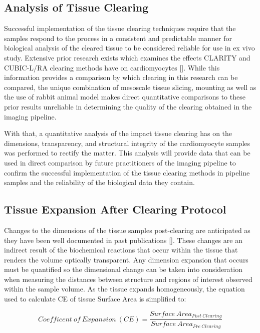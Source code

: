 \subsection{Analysis of Tissue Clearing}
Successful implementation of the tissue clearing techniques require that the samples respond to the process in a consistent and predictable manner for biological analysis of the cleared tissue to be considered reliable for use in ex vivo study. Extensive prior research exists which examines the effects CLARITY and CUBIC-L/RA clearing methods have on cardiomyocytes []. While this information provides a comparison by which clearing in this research can be compared, the unique combination of mesoscale tissue slicing, mounting as well as the use of rabbit animal model makes direct quantitative comparisons to these prior results unreliable in determining the quality of the clearing obtained in the imaging pipeline.

With that, a quantitative analysis of the impact tissue clearing has on the dimensions, transparency, and structural integrity of the cardiomyocyte samples was performed to rectify the matter. This analysis will provide data that can be used in direct comparison by future practitioners of the imaging pipeline to confirm the successful implementation of the tissue clearing methods in pipeline samples and the reliability of the biological data they contain. 

\subsection{Tissue Expansion After Clearing Protocol}
Changes to the dimensions of the tissue samples post-clearing are anticipated as they have been well documented in past publications []. These changes are an indirect result of the biochemical reactions that occur within the tissue that renders the volume optically transparent. Any dimension expansion that occurs must be quantified so the dimensional change can be taken into consideration when measuring the distances between structure and regions of interest observed within the sample volume. As the tissue expands homogeneously, the equation used to calculate CE of tissue Surface Area is simplified to:

\newline
\begin{equation}
Coefficent\ of\ Expansion\ (CE)= \frac{Surface\ Area_{Post\ Clearing}}{Surface\ Area_{Pre\ Clearing}} 
\end{equation}
\medskip

